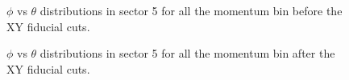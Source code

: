 \begin{figure}[ht]
    \centering
    \caption{$\phi$ vs $\theta$ distributions in sector 5 for all the momentum bin before the XY fiducial cuts.}
    \label{fig:phiTheta-before_sector-5}
\end{figure}

\begin{figure}[ht]
    \centering
    \caption{$\phi$ vs $\theta$ distributions in sector 5 for all the momentum bin after the XY fiducial cuts.}
    \label{fig:phiTheta-after_sector-5}
\end{figure}




